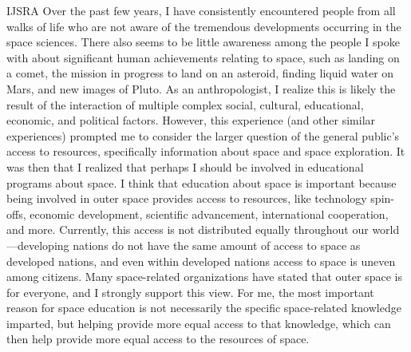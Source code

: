 \begin{labeling}{IJSRA}
	Over the past few years, I have consistently encountered people from all walks of life who are not aware of the tremendous developments occurring in the space sciences. There also seems to be little awareness among the people I spoke with about significant human achievements relating to space, such as landing on a comet, the mission in progress to land on an asteroid, finding liquid water on Mars, and new images of Pluto. As an anthropologist, I realize this is likely the result of the interaction of multiple complex social, cultural, educational, economic, and political factors. However, this experience (and other similar experiences) prompted me to consider the larger question of the general public’s access to resources, specifically information about space and space exploration. It was then that I realized that perhaps I should be involved in educational programs about space. I think that education about space is important because being involved in outer space provides access to resources, like technology spin-offs, economic development, scientific advancement, international cooperation, and more. Currently, this access is not distributed equally throughout our world—developing nations do not have the same amount of access to space as developed nations, and even within developed nations access to space is uneven among citizens. Many space-related organizations have stated that outer space is for everyone, and I strongly support this view. For me, the most important reason for space education is not necessarily the specific space-related knowledge imparted, but helping provide more equal access to that knowledge, which can then help provide more equal access to the resources of space.


\end{labeling}
